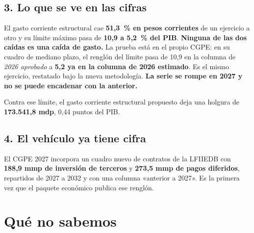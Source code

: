 \subsection*{3. Lo que se ve en las cifras}



El gasto corriente estructural cae \textbf{51,3~\% en pesos corrientes} de un ejercicio a
otro y su límite máximo pasa de \textbf{10,9 a 5,2~\% del PIB}. \textbf{Ninguna de las dos
caídas es una caída de gasto.} La prueba está en el propio CGPE: en su cuadro de mediano
plazo, el renglón del límite pasa de 10,9 en la columna de \emph{2026 aprobado} a
\textbf{5,2 ya en la columna de 2026 estimado}. Es el mismo ejercicio, restatado bajo la
nueva metodología. \textbf{La serie se rompe en 2027 y no se puede encadenar con la
anterior.}

Contra ese límite, el gasto corriente estructural propuesto deja una holgura de
\textbf{173.541,8 mdp}, 0,44 puntos del PIB.

\subsection*{4. El vehículo ya tiene cifra}

El CGPE 2027 incorpora un cuadro nuevo de contratos de la LFIIEDB con
\textbf{188,9 mmp de inversión de terceros} y \textbf{273,5 mmp de pagos diferidos},
repartidos de 2027 a 2032 y con una columna «anterior a 2027». Es la primera vez que el
paquete económico publica ese renglón.

\section{Qué no sabemos}

